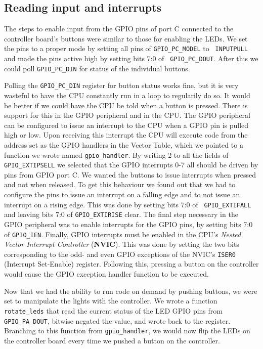 \subsection{Reading input and interrupts}

The steps to enable input from the GPIO pins of port C connected to the
controller board's buttons were similar to those for enabling the LEDs. We set
the pins to a proper mode by setting all pins of {\tt GPIO\_PC\_MODEL} to {\tt
INPUTPULL} and made the pins active high by setting bits 7:0 of {\tt
GPIO\_PC\_DOUT}. After this we could poll {\tt GPIO\_PC\_DIN} for status of the
individual buttons.

Polling the {\tt GPIO\_PC\_DIN} register for button status works fine, but it is
very wasteful to have the CPU constantly run in a loop to regularily do so. It
would be better if we could have the CPU be told when a button is pressed. There
is support for this in the GPIO peripheral and in the CPU. The GPIO peripheral
can be configured to issue an interrupt to the CPU when a GPIO pin is pulled
high or low. Upon receiving this interrupt the CPU will execute code from the
address set as the GPIO handlers in the Vector Table, which we pointed to a
function we wrote named {\tt gpio\_handler}. By writing 2 to all the fields of
{\tt GPIO\_EXTIPSELL} we selected that the GPIO interrupts 0-7 all should be
driven by pins from GPIO port C. We wanted the buttons to issue interrupts when
pressed and not when released. To get this behaviour we found out that we had to
configure the pins to issue an interrupt on a falling edge and to not issue an
interrupt on a rising edge. This was done by setting bits 7:0 of {\tt
GPIO\_EXTIFALL} and leaving bits 7:0 of {\tt GPIO\_EXTIRISE} clear.  The final
step necessary in the GPIO peripheral was to enable interrupts for the GPIO
pins, by setting bits 7:0 of {\tt GPIO\_IEN}. Finally, GPIO interrupts must be
enabled in the CPU's \emph{Nested Vector Interrupt Controller} (\textbf{NVIC}).
This was done by setting the two bits corresponding to the odd- and even GPIO
exceptions of the NVIC's {\tt ISER0} (Interrupt Set-Enable) register. Following
this, pressing a button on the controller would cause the GPIO exception handler
function to be executed.

Now that we had the ability to run code on demand by pushing buttons, we were
set to manipulate the lights with the controller. We wrote a function {\tt
rotate\_leds} that read the current status of the LED GPIO pins from {\tt
GPIO\_PA\_DOUT}, bitwise negated the value, and wrote back to the register.
Branching to this function from {\tt gpio\_handler}, we would now flip the LEDs
on the controller board every time we pushed a button on the controller.

